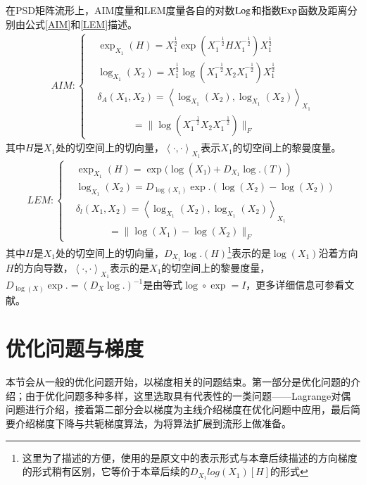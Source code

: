 在PSD矩阵流形上，AIM度量\cite{AIM_metric}和LEM度量\cite{LEM_metric}各自的对数${\rm Log}$和指数${\rm Exp}$函数及距离分别由公式\ref{AIM}和\ref{LEM}描述。
\begin{equation}
\label{AIM}
\begin{split}
AIM:\left\{
\begin{aligned}
&\exp_{X_1}(H)=X_{1}^{\frac{1}{2}}\exp(X_{1}^{-\frac{1}{2}}HX_{1}^{-\frac{1}{2}})X_{1}^{\frac{1}{2}}\\
&\log_{{X_1}}({X_2})={X_{1}^{\frac{1}{2}}}\log({X_{1}^{-\frac{1}{2}}}{X_2}{X_{1}^{-\frac{1}{2}}}){X_{1}^{\frac{1}{2}}}\\
&\delta_{A}({X_1,X_2})=\left<\log_{{X_1}}({X_2}),\log_{{X_1}}({X_2})\right>_{{X_1}}\\
&~~~~~~~~~~~~~~~~=\|\log({X_{1}^{-\frac{1}{2}}}{X_2}{X_{1}^{-\frac{1}{2}}})\|_F
\end{aligned}
\right.
\end{split}
\end{equation}
其中${H}$是${X_1}$处的切空间上的切向量，$\left<\cdot,\cdot\right>_{{X_1}}$表示$X_1$的切空间上的黎曼度量。
\begin{equation}
\label{LEM}
\begin{split}
LEM:\left\{
\begin{aligned}
&\exp_{{X_1}}({H})=\exp(\log({X_{1})}+D_{X_1}\log.({T}))\\
&\log_{{X_1}}({X_2})=D_{\log({X_1})}\exp.(\log({X_2})-\log({X_2}))\\
&\delta_{l}({X_1,X_2})=\left<\log_{{X_1}}({X_2}),\log_{{X_1}}({X_2})\right>_{{X_1}}\\
&~~~~~~~~~~~~~~~=\|\log({X_{1}})-\log({X_{2}})\|_F
\end{aligned}
\right.
\end{split}
\end{equation}
其中${H}$是${X_1}$处的切空间上的切向量，$D_{X_1}\log.(H)$\footnote{这里为了描述的方便，使用的是原文\cite{LEM_metric}中的表示形式与本章后续描述的方向梯度的形式稍有区别，它等价于本章后续的$D_{X_1}log(X_1)[H]$的形式}表示的是$\log(X_1)$沿着方向$H$的方向导数，$\left<\cdot,\cdot\right>_{{X_1}}$表示的是$X_1$的切空间上的黎曼度量，$D_{\log({X})}\exp.=(D_{{X}}\log.)^{-1}$是由等式$\log \circ \exp={I}$，更多详细信息可参看文献\cite{LEM_metric}。
\section{优化问题与梯度}
\label{sec:opt_and_gradient}
本节会从一般的优化问题开始，以梯度相关的问题结束。第一部分是优化问题的介绍；由于优化问题多种多样，这里选取具有代表性的一类问题——Lagrange对偶问题进行介绍，接着第二部分会以梯度为主线介绍梯度在优化问题中应用，最后简要介绍梯度下降与共轭梯度算法，为将算法扩展到流形上做准备。
